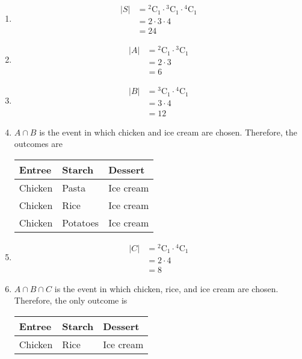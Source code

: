 \documentclass[fleqn, a4paper, 11pt, oneside]{amsart}
\theoremstyle{definition}
\theoremstyle{theorem}
\newcommand*{\comb}[2]{{}^{#1}\mathrm{C}_{#2}}%
\begin{document}
\begin{solution}
	\begin{enumerate}[leftmargin=*]
		\item
			\begin{align*}
				|S| & = \comb{2}{1} \cdot \comb{3}{1} \cdot \comb{4}{1} \\
                                    & = 2 \cdot 3 \cdot 4                               \\
                                    & = 24
			\end{align*}
		\item
			\begin{align*}
				|A| & = \comb{2}{1} \cdot \comb{3}{1} \\
                                    & = 2 \cdot 3                     \\
                                    & = 6
			\end{align*}
		\item
			\begin{align*}
				|B| & = \comb{3}{1} \cdot \comb{4}{1} \\
                                    & = 3 \cdot 4                     \\
                                    & = 12
			\end{align*}
		\item
			$A \cap B$ is the event in which chicken and ice cream are chosen.
			Therefore, the outcomes are
			\begin{table}
				\centering
				\begin{tabular}{l l l}
					\toprule
					Entree & Starch & Dessert\\
					\midrule
					Chicken & Pasta & Ice cream\\
					Chicken & Rice & Ice cream\\
					Chicken & Potatoes & Ice cream\\
					\bottomrule
				\end{tabular}
			\end{table}
		\item
			\begin{align*}
				|C| & = \comb{2}{1} \cdot \comb{4}{1} \\
                                    & = 2 \cdot 4                     \\
                                    & = 8
			\end{align*}
		\item
			$A \cap B \cap C$ is the event in which chicken, rice, and ice cream are chosen.
			Therefore, the only outcome is
			\begin{table}
				\centering
				\begin{tabular}{l l l}
					\toprule
					Entree & Starch & Dessert\\
					\midrule
					Chicken & Rice & Ice cream\\
					\bottomrule
				\end{tabular}
			\end{table}
	\end{enumerate}
\end{solution}
\end{document}
